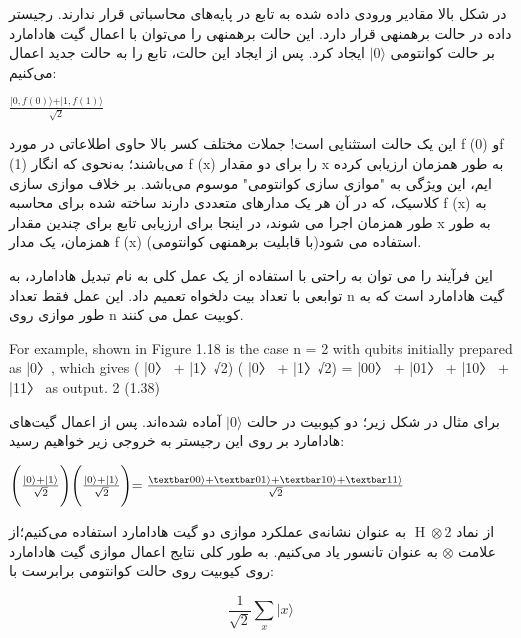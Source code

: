 \documentclass{book}
\begin{document}
در شکل بالا مقادیر ورودی داده شده به تابع  در پایه‌های محاسباتی قرار ندارند. رجیستر داده در حالت برهمنهی  قرار دارد. این حالت برهمنهی را می‌توان با اعمال گیت هادامارد بر حالت کوانتومی $\vert 0 \rangle$ ایجاد کرد. پس از ایجاد این حالت، تابع  را به حالت جدید اعمال می‌کنیم:
\begin{center}
	$\frac{\vert 0,f(0) \rangle +\vert 1,f(1) \rangle }{\sqrt{2}}$
\end{center}

این یک حالت استثنایی است! جملات مختلف کسر بالا حاوی اطلاعاتی در مورد f (0) وf (1) می‌باشند؛ به‌نحوی که انگار f (x) را برای دو مقدار x به طور همزمان ارزیابی کرده ایم، این ویژگی به "موازی  سازی کوانتومی" موسوم می‌باشد. بر خلاف موازی سازی کلاسیک، که در آن هر یک مدارهای متعددی دارند ساخته شده برای محاسبه f (x) به طور همزمان اجرا می شوند، در اینجا برای ارزیابی تابع برای چندین مقدار x به طور همزمان، یک مدار f (x) (با قابلیت برهمنهی کوانتومی)استفاده می شود.

این فرآیند را می توان به راحتی  با استفاده از یک عمل کلی به نام تبدیل هادامارد، به توابعی با تعداد بیت دلخواه تعمیم داد. این عمل فقط تعداد n گیت هادامارد است که به طور موازی روی n کوبیت عمل می کنند.



 For example, shown in Figure 1.18 is the case n = 2 with qubits initially prepared as |0〉, which gives
( |0〉 + |1〉√2) ( |0〉 + |1〉√2) = |00〉 + |01〉 + |10〉 + |11〉 as output.
2 (1.38)

برای مثال در شکل زیر؛ دو کیوبیت در حالت $\vert 0 \rangle$ آماده شده‌‌اند. پس از اعمال گیت‌های هادامارد بر روی این رجیستر به خروجی زیر خواهیم رسید: 

\begin{center}
	$ \Biggl( \frac{\vert 0 \rangle + \vert 1 \rangle}{\sqrt{2}}\Biggl)\Biggl( \frac{\vert 0 \rangle + \vert 1 \rangle}{\sqrt{2}}\Biggl) = \frac{\textbar00\rangle + \textbar01\rangle + \textbar10\rangle + \textbar11\rangle}{\sqrt{2}}$

\end{center}

از نماد $\operatorname{H} \otimes 2$ به عنوان نشانه‌ی عملکرد موازی دو گیت هادامارد استفاده می‌کنیم؛از علامت $\otimes$ به عنوان تانسور یاد می‌کنیم. به طور کلی نتایج اعمال موازی گیت هادامارد روی  کیوبیت روی حالت کوانتومی برابرست با:

\begin{center}
	\[\frac{1}{\sqrt{2}} \sum_{x} \vert x \rangle\]
\end{center}
\end{document}
